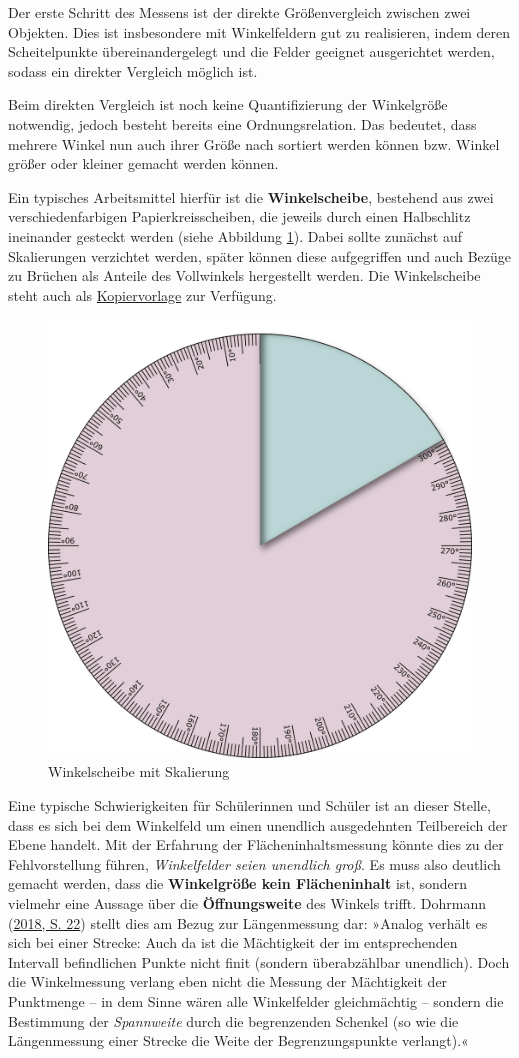\documentclass[
]{scrbook}
\theoremstyle{definition}
\theoremstyle{definition}
\theoremstyle{definition}
\theoremstyle{definition}
\theoremstyle{remark}
\begin{document}
Der erste Schritt des Messens ist der direkte Größenvergleich zwischen zwei Objekten. Dies ist insbesondere mit Winkelfeldern gut zu realisieren, indem deren Scheitelpunkte übereinandergelegt und die Felder geeignet ausgerichtet werden, sodass ein direkter Vergleich möglich ist.

Beim direkten Vergleich ist noch keine Quantifizierung der Winkelgröße notwendig, jedoch besteht bereits eine Ordnungsrelation. Das bedeutet, dass mehrere Winkel nun auch ihrer Größe nach sortiert werden können bzw. Winkel größer oder kleiner gemacht werden können.

Ein typisches Arbeitsmittel hierfür ist die \textbf{Winkelscheibe}, bestehend aus zwei verschiedenfarbigen Papierkreisscheiben, die jeweils durch einen Halbschlitz ineinander gesteckt werden (siehe Abbildung \ref{fig:Winkelscheibe}). Dabei sollte zunächst auf Skalierungen verzichtet werden, später können diese aufgegriffen und auch Bezüge zu Brüchen als Anteile des Vollwinkels hergestellt werden.
Die Winkelscheibe steht auch als \href{files/Stoffdidaktik-WiSe2223-Kap11-Winkelscheibe.pdf}{Kopiervorlage} zur Verfügung.

\begin{figure}

{\centering \includegraphics[width=0.5\linewidth]{pictures/11-Winkelscheibe} 

}

\caption{Winkelscheibe mit Skalierung}\label{fig:Winkelscheibe}
\end{figure}

Eine typische Schwierigkeiten für Schülerinnen und Schüler ist an dieser Stelle, dass es sich bei dem Winkelfeld um einen unendlich ausgedehnten Teilbereich der Ebene handelt. Mit der Erfahrung der Flächeninhaltsmessung könnte dies zu der Fehlvorstellung führen, \emph{Winkelfelder seien unendlich groß}. Es muss also deutlich gemacht werden, dass die \textbf{Winkelgröße kein Flächeninhalt} ist, sondern vielmehr eine Aussage über die \textbf{Öffnungsweite} des Winkels trifft. Dohrmann (\protect\hyperlink{ref-Dohrmann2018}{2018, S. 22}) stellt dies am Bezug zur Längenmessung dar: »Analog verhält es sich bei einer Strecke: Auch da ist die Mächtigkeit der im entsprechenden Intervall befindlichen Punkte nicht finit (sondern überabzählbar unendlich). Doch die Winkelmessung verlang eben nicht die Messung der Mächtigkeit der Punktmenge -- in dem Sinne wären alle Winkelfelder gleichmächtig -- sondern die Bestimmung der \emph{Spannweite} durch die begrenzenden Schenkel (so wie die Längenmessung einer Strecke die Weite der Begrenzungspunkte verlangt).«
\end{document}
